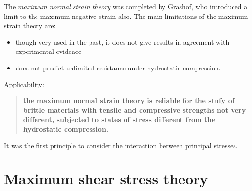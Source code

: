 \documentclass[class=report, crop=false, 12pt,a4paper]{standalone}
\begin{document}
The \textit{maximum normal strain theory} was completed by Grashof, who introduced a limit to the maximum negative strain also. The main limitations of the maximum strain theory are:
\begin{itemize}
  \item though very used in the past, it does not give results in agreement with experimental evidence
  \item does not predict unlimited resistance under hydrostatic compression.
\end{itemize}
Applicability:
\begin{quotation}
  \textbf{the maximum normal strain theory is reliable for the stufy of brittle materials with tensile and compressive strengths not very different, subjected to states of stress different from the hydrostatic compression.}
\end{quotation}
It was the first principle to consider the interaction between principal stresses.
\section{Maximum shear stress theory}
\end{document}
